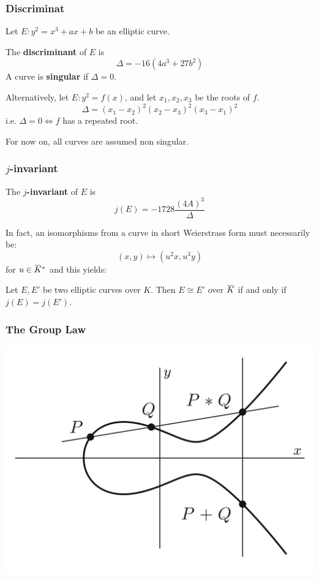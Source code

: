 \documentclass{beamer}
\newcommand{\overbar}[1]{\mkern 1.5mu\overline{\mkern-1.5mu#1\mkern-1.5mu}\mkern 1.5mu}
\begin{document}
\begin{frame}
    \frametitle{Discriminat}
    \begin{definition}
        Let $E: y^2 = x^3 + a x + b$ be an elliptic curve.

        The \textbf{discriminant} of $E$ is 
            \[ \Delta = -16 (4 a^3 + 27 b^2) \] 
        A curve is \textbf{singular} if $\Delta = 0$.
   \end{definition}
    Alternatively, let $E: y^2 = f(x)$, and let $x_1, x_2, x_3$ be the roots of $f$. 
    \[ \Delta = (x_1 - x_2)^2(x_2 - x_3)^2(x_3 - x_1)^2 \]
    i.e. $\Delta = 0 \iff f$ has a repeated root.

    For now on, all curves are assumed non singular.
    
\end{frame}

\begin{frame}
    \frametitle{$j$-invariant}
    \begin{definition}
         The $j$\textbf{-invariant} of $E$ is
            \[ j(E) = -1728 \frac{(4 A)^3}{\Delta} \]
    \end{definition} 
    In fact, an isomorphisms from a curve in short Weierstrass form must necessarily be:
    \[ (x, y) \mapsto (u^2 x, u^3 y) \]
    for $u \in \overbar{K}^*$ and this yields:
     \begin{theorem}
        Let $E, E'$ be two elliptic curves over $K$. Then $E \cong E'$ over $\overbar{K}$ if and only if $j(E) = j(E')$. 
    \end{theorem}  
\end{frame}

\begin{frame}
    \frametitle{The Group Law} 
    \begin{center}
        \includegraphics[width=20 em]{group_law.png}
    \end{center}
\end{frame}
\end{document}
